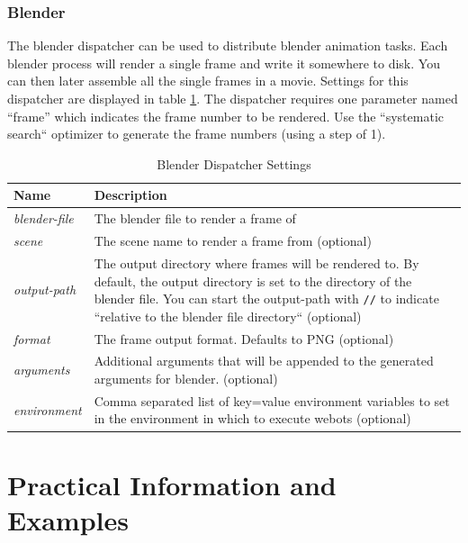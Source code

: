 \documentclass{report}
\begin{document}
\subsection{Blender}
The blender dispatcher can be used to distribute blender animation tasks. Each
blender process will render a single frame and write it somewhere to disk.
You can then later assemble all the single frames in a movie. Settings
for this dispatcher are displayed in table \ref{tab:blender_settings}. The
dispatcher requires one parameter named ``frame'' which indicates the frame
number to be rendered. Use the ``systematic search`` optimizer to generate
the frame numbers (using a step of 1).

\begin{table}[h!tb]\caption{Blender Dispatcher Settings}\label{tab:blender_settings}\vspace{0.1in}
	\centering

	\begin{tabular}{p{3cm} p{13cm}}
		\toprule
		\textbf{Name} & \textbf{Description} \\
		\midrule
		\textit{blender-file} & The blender file to render a frame of \\
		\textit{scene} & The scene name to render a frame from (optional) \\
		\textit{output-path} & The output directory where frames will be rendered to.
		                       By default, the output directory is set to the
		                       directory of the blender file. You can start the
		                       output-path with \verb!//! to indicate
		                       ``relative to the blender file directory`` (optional) \\
		\textit{format} & The frame output format. Defaults to PNG (optional) \\
		\textit{arguments} & Additional arguments that will be appended to the
		                     generated arguments for blender. (optional) \\
		\textit{environment} & Comma separated list of key=value environment variables
		              to set in the environment in which to execute webots
		              (optional) \\
		\bottomrule
	\end{tabular}
\end{table}

\chapter{Practical Information and Examples}
\end{document}
